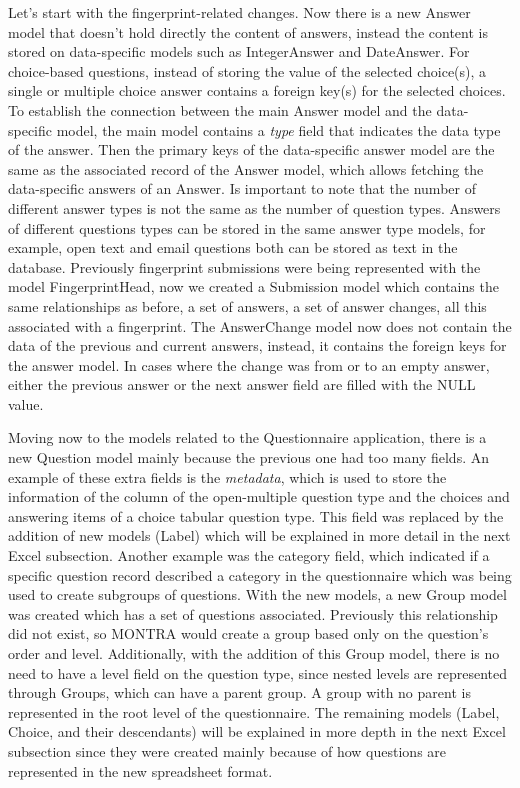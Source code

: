 Let's start with the fingerprint-related changes.
Now there is a new Answer model that doesn't hold directly the content of answers, instead the content is stored on data-specific models such as IntegerAnswer and DateAnswer.
For choice-based questions, instead of storing the value of the selected choice(s), a single or multiple choice answer contains a foreign key(s) for the selected choices.
To establish the connection between the main Answer model and the data-specific model, the main model contains a \textit{type} field that indicates the data type of the answer.
Then the primary keys of the data-specific answer model are the same as the associated record of the Answer model, which allows fetching the data-specific answers of an Answer.
Is important to note that the number of different answer types is not the same as the number of question types.
Answers of different questions types can be stored in the same answer type models, for example, open text and email questions both can be stored as text in the database.
Previously fingerprint submissions were being represented with the model FingerprintHead, now we created a Submission model which contains the same relationships as before, a set of answers, a set of answer changes, all this associated with a fingerprint.
The AnswerChange model now does not contain the data of the previous and current answers, instead, it contains the foreign keys for the answer model.
In cases where the change was from or to an empty answer, either the previous answer or the next answer field are filled with the NULL value.

Moving now to the models related to the Questionnaire application, there is a new Question model mainly because the previous one had too many fields.
An example of these extra fields is the \textit{metadata}, which is used to store the information of the column of the open-multiple question type and the choices and answering items of a choice tabular question type.
This field was replaced by the addition of new models (Label) which will be explained in more detail in the next Excel subsection.
Another example was the category field, which indicated if a specific question record described a category in the questionnaire which was being used to create subgroups of questions.
With the new models, a new Group model was created which has a set of questions associated.
Previously this relationship did not exist, so MONTRA would create a group based only on the question's order and level.
Additionally, with the addition of this Group model, there is no need to have a level field on the question type, since nested levels are represented through Groups, which can have a parent group.
A group with no parent is represented in the root level of the questionnaire.
The remaining models (Label, Choice, and their descendants) will be explained in more depth in the next Excel subsection since they were created mainly because of how questions are represented in the new spreadsheet format.

